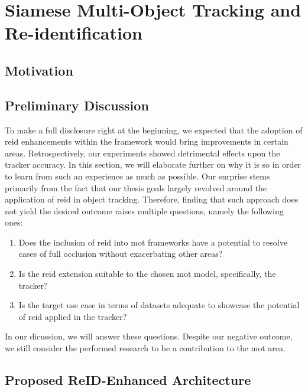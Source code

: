\section{Siamese Multi-Object Tracking and Re-identification}
\label{sec:SiamMOTandReID}

\subsection{Motivation}

\subsection{Preliminary Discussion}

To make a full disclosure right at the beginning, we expected that the adoption of \gls{reid} enhancements within the \siammot{} framework would bring improvements in certain areas. Retrospectively, our experiments showed detrimental effects upon the tracker accuracy. In this section, we will elaborate further on why it is so in order to learn from such an experience as much as possible. Our surprise stems primarily from the fact that our thesis goals largely revolved around the application of \gls{reid} in object tracking. Therefore, finding that such approach does not yield the desired outcome raises multiple questions, namely the following ones:
\begin{enumerate}
    \item Does the inclusion of \gls{reid} into \gls{mot} frameworks have a potential to resolve cases of full occlusion without exacerbating other areas?
    \item Is the \gls{reid} extension suitable to the chosen \gls{mot} model, specifically, the \siammot{} tracker?
    \item Is the target use case in terms of datasets adequate to showcase the potential of \gls{reid} applied in the \siammot{} tracker?
\end{enumerate}
In our dicussion, we will answer these questions. Despite our negative outcome, we still consider the performed research to be a contribution to the \gls{mot} area.

\subsection{Proposed ReID-Enhanced Architecture}
\label{ssec:ProposedReIDEnhancedArchitecture}

